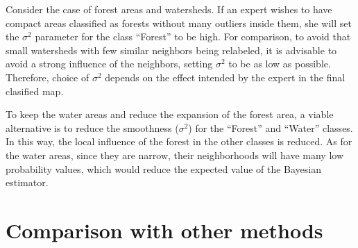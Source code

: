 \documentclass[
]{jss}
\begin{document}
Consider the case of forest areas and watersheds. If an expert wishes to have compact areas classified as forests without many outliers inside them, she will set the \(\sigma^2\) parameter for the class ``Forest'' to be high. For comparison, to avoid that small watersheds with few similar neighbors being relabeled, it is advisable to avoid a strong influence of the neighbors, setting \(\sigma^2\) to be as low as possible. Therefore, choice of \(\sigma^2\) depends on the effect intended by the expert in the final clasified map.

To keep the water areas and reduce the expansion of the forest area, a viable alternative is to reduce the smoothness (\(\sigma^2\)) for the ``Forest'' and ``Water'' classes. In this way, the local influence of the forest in the other classes is reduced. As for the water areas, since they are narrow, their neighborhoods will have many low probability values, which would reduce the expected value of the Bayesian estimator.

\hypertarget{comparison-with-other-methods}{%
\section{Comparison with other methods}\label{comparison-with-other-methods}}

\renewcommand\refname{Conclusion}

\end{document}
